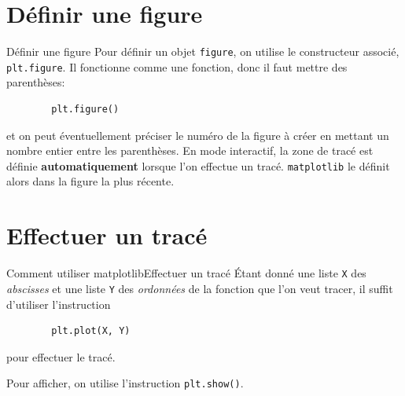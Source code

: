 \documentclass[10pt,xcolor={dvipsnames}]{beamer}
\begin{document}
\section{Définir une figure}

\begin{frame}[fragile]{Définir une figure}
	Pour définir un objet \lstinline|figure|, on utilise le constructeur associé, \lstinline|plt.figure|. Il fonctionne comme une fonction, donc il faut mettre des parenthèses:\pause
	\begin{lstlisting}
		plt.figure()
	\end{lstlisting}
	\pause
	et on peut éventuellement préciser le numéro de la figure à créer en mettant un nombre entier entre les parenthèses.
	\pause
	En mode interactif, la zone de tracé est définie \textbf{automatiquement} lorsque l'on effectue un tracé. \lstinline|matplotlib| le définit alors dans la figure la plus récente.
\end{frame}

\section{Effectuer un tracé}

\begin{frame}[fragile]{Comment utiliser matplotlib}{Effectuer un tracé}
	Étant donné une liste \lstinline|X| des \textit{abscisses} et une liste \lstinline|Y| des \textit{ordonnées} de la fonction que l'on veut tracer, il suffit d'utiliser l'instruction
	\begin{lstlisting}
		plt.plot(X, Y)
	\end{lstlisting} 
	pour effectuer le tracé.
	
	Pour afficher, on utilise l'instruction \lstinline|plt.show()|.
\end{frame}
\end{document}
